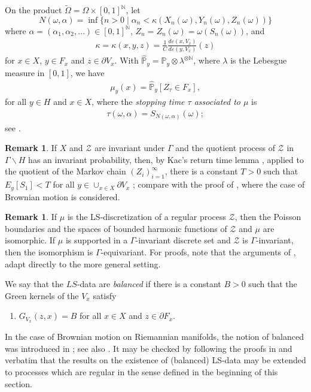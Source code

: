 \documentclass[12pt,a4paper]{amsart}
\newcounter{alph}
\numberwithin{equation}{section}
\theoremstyle{definition}
\newtheorem{rem}[equation]{Remark}
\def\N{\mathbb N}
\def\p{\mathbb P}
\def\ve{\varepsilon}
\begin{document}
On the product $\tilde\Omega=\Omega\times[0,1]^\N$, let
\begin{equation}\label{na}
	N(\omega,\alpha)
	= \inf \{ n>0 \mid \alpha_n < \kappa(X_n(\omega),Y_n(\omega),Z_n(\omega)) \}
\end{equation}
where $\alpha=(\alpha_1,\alpha_2,\dots)\in[0,1]^\N$, $Z_n=Z_n(\omega)=\omega(S_n(\omega))$, and
\begin{align}\label{nk}
	\kappa = \kappa(x,y,z)
	= \frac1C\frac{d\ve(x,V_x)}{d\ve(y,V_x)}(z)
\end{align}
for $x\in X$, $y\in F_x$ and $z\in\partial V_x$. With $\hat{\p}_y=\p_y\otimes \lambda^{\otimes\N}$, where $\lambda$ is the Lebesgue measure in $[0,1]$, we have
\begin{align}\label{muy}
    \mu_y(x)=\hat{\p}_y[Z_\tau\in F_x],
\end{align}
for all $y\in H$ and $x\in X$, where the \textit{stopping time $\tau$ associated to $\mu$} is
\begin{align}\label{tau}
	\tau(\omega,\alpha)=S_{N(\omega,\alpha)}(\omega);
\end{align}
see \cite[Chapter 8]{LS}.

\begin{rem}\label{s1}
If $X$ and $\mathcal{Z}$ are invariant under $\Gamma$ and the quotient process of $\mathcal Z$ in $\Gamma\backslash H$ has an invariant probability, then, by Kac's return time lemma \cite{Ka}, applied to the quotient of the Markov chain $(Z_i)_{i=1}^\infty$, there is a constant $T>0$ such that $E_y[S_1] < T$ for all $y\in \cup_{x\in X}\partial V_x$ ; compare with the proof of \cite[Theorem 3.2(b)]{BL2}, where the case of Brownian motion is considered.
\end{rem}

\begin{rem}\label{poisson}
If $\mu$ is the LS-discretization of a regular process $\mathcal Z$, then the Poisson boundaries and the spaces of bounded harmonic functions of $\mathcal Z$ and $\mu$ are isomorphic. If $\mu$ is supported in a $\Gamma$-invariant discrete set and $\mathcal Z$ is $\Gamma$-invariant, then the isomorphism is $\Gamma$-equivariant. For proofs, note that the arguments of \cite{Kai}, \cite{BL} adapt directly to the more general setting.
\end{rem}

We say that the $LS$-data are \emph{balanced} if there is a constant $B>0$ such that the Green kernels of the $V_x$ satisfy
\begin{enumerate}[label=(D5)]
\item\label{balan}
$G_{V_x}(z,x) = B$ for all $x\in X$ and $z\in\partial F_x$.
\end{enumerate}
In the case of Brownian motion on Riemannian manifolds, the notion of balanced was introduced in \cite{BL2}; see also \cite[(D5) in Section 3]{BP}.
It may be checked by following the proofs in \cite{LS} and \cite{BL2} verbatim that the results on the existence of (balanced) LS-data may be extended to processes which are regular in the sense defined in the beginning of this section.
\end{document}
